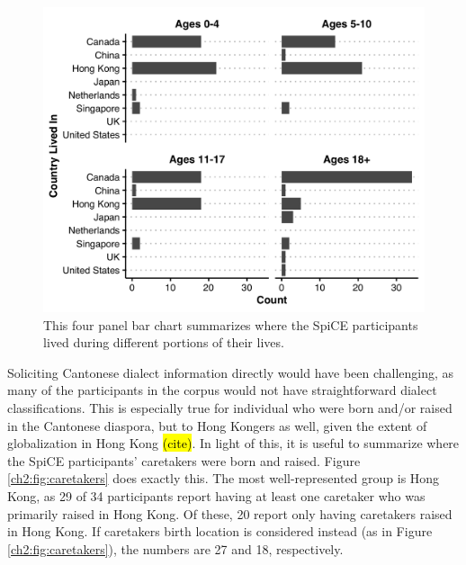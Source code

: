 \begin{figure}[!htbp]
  \begin{center}
  \includegraphics[width=4.9in]{figures/ch2_placeslived_5in.png} 
  \caption{This four panel bar chart summarizes where the SpiCE participants lived during different portions of their lives.}
  \label{ch2:fig:placeslived}
  \end{center}
\end{figure}

Soliciting Cantonese dialect information directly would have been challenging, as many of the participants in the corpus would not have straightforward dialect classifications. This is especially true for individual who were born and/or raised in the Cantonese diaspora, but to Hong Kongers as well, given the extent of globalization in Hong Kong \hl{(cite)}. In light of this, it is useful to summarize where the SpiCE participants' caretakers were born and raised. Figure \ref{ch2:fig:caretakers} does exactly this. The most well-represented group is Hong Kong, as 29 of 34 participants report having at least one caretaker who was primarily raised in Hong Kong. Of these, 20 report only having caretakers raised in Hong Kong. If caretakers birth location is considered instead (as in Figure \ref{ch2:fig:caretakers}), the numbers are 27 and 18, respectively. 


